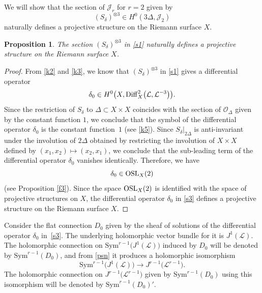\documentclass[pdftex]{sigma}
\numberwithin{equation}{section}
\newtheorem{Proposition}[Theorem]{Proposition}
 { \theoremstyle{definition}
\newtheorem{Definition}[Theorem]{Definition}
\newtheorem{Note}[Theorem]{Note}
\newtheorem{Example}[Theorem]{Example}
\newtheorem{Remark}[Theorem]{Remark} }
\begin{document}
We will show that the section of $\mathcal{J}_r$ for $r = 2$ given by
\begin{equation}\label{s1}
(S_\delta)^{\otimes 3} \in H^0(3\Delta, \mathcal{J}_2)
\end{equation}
naturally defines a projective structure on the Riemann surface $X$.

\begin{Proposition}
The section $(S_\delta)^{\otimes 3}$ in \eqref{s1} naturally defines a projective structure on
the Riemann surface $X$.
\end{Proposition}

\begin{proof}From \eqref{k2} and \eqref{k3}, we know that $(S_\delta)^{\otimes 3}$ in \eqref{s1} gives a differential operator
\begin{equation}\label{s3}
\delta_0 \in H^0\bigl(X, {\rm Diff}^2_X\bigl({\mathcal L}, {\mathcal L}^{-3}\bigr)\bigr).
\end{equation}
Since the restriction of $S_\delta$ to $\Delta \subset X\times X$ coincides with the section of
${\mathcal O}_\Delta$ given by the constant function $1$, we conclude that the symbol of the differential
operator $\delta_0$ is the constant function~$1$ (see \eqref{k5}). Since
$S_\delta\big\vert_{2\Delta}$ is anti-invariant under the involution of $2\Delta$ obtained by restricting
the involution of $X\times X$ defined by $(x_1, x_2) \longmapsto (x_2, x_1)$, we conclude that
the sub-leading term of the differential operator $\delta_0$ vanishes identically.
Therefore, we have
\[
\delta_0 \in {\rm OSL}_X(2)
\]
(see Proposition \ref{f3}). Since the space ${\rm OSL}_X(2)$ is identified with the space of projective structures on $X$,
the differential operator $\delta_0$ in \eqref{s3} defines a projective structure on
the Riemann surface $X$.
\end{proof}

Consider the flat connection $D_0$ given by the sheaf of solutions of the differential operator $\delta_0$ in~\eqref{s3}.
The underlying holomorphic vector bundle for it is $J^1(\mathcal L)$.
The holomorphic connection on $\text{Sym}^{r-1}\bigl(J^1(\mathcal L)\bigr)$ induced by $D_0$ will be denoted by
$\text{Sym}^{r-1}(D_0)$, and from \eqref{psn} it produces a holomorphic isomorphism
\[\text{Sym}^{r-1}\bigl(J^1(\mathcal L)\bigr) \longrightarrow J^{r-1}\bigl({\mathcal L}^{r-1}\bigr).
\]
The holomorphic connection on $J^{r-1}\bigl({\mathcal L}^{r-1}\bigr)$
given by $\text{Sym}^{r-1}(D_0)$ using this isomorphism will be denoted by $\text{Sym}^{r-1}(D_0)'$.
\end{document}
